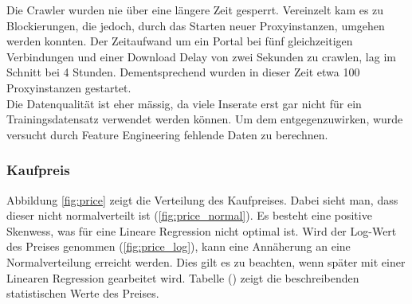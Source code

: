 \newline
%
Die Crawler wurden nie über eine längere Zeit gesperrt. Vereinzelt kam es zu Blockierungen, die jedoch, durch das Starten neuer Proxyinstanzen, umgehen werden konnten. Der Zeitaufwand um ein Portal bei fünf gleichzeitigen Verbindungen und einer Download Delay von zwei Sekunden zu crawlen, lag im Schnitt bei 4 Stunden. Dementsprechend wurden in dieser Zeit etwa 100 Proxyinstanzen gestartet.\\[2ex]
%
Die Datenqualität ist eher mässig, da viele Inserate erst gar nicht für ein Trainingsdatensatz verwendet werden können. Um dem entgegenzuwirken, wurde versucht durch Feature Engineering fehlende Daten zu berechnen.
%
\subsubsection{Kaufpreis}
Abbildung \ref{fig:price} zeigt die Verteilung des Kaufpreises. Dabei sieht man, dass dieser nicht normalverteilt ist (\ref{fig:price_normal}). Es besteht eine positive Skenwess, was für eine Lineare Regression nicht optimal ist. Wird der Log-Wert des Preises genommen (\ref{fig:price_log}), kann eine Annäherung an eine Normalverteilung erreicht werden. Dies gilt es zu beachten, wenn später mit einer Linearen Regression gearbeitet wird.
Tabelle () zeigt die beschreibenden statistischen Werte des Preises.
%

